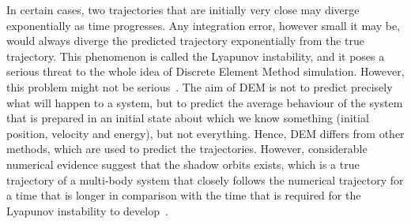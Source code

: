In certain cases, two trajectories that are initially very close may diverge 
exponentially as time progresses. Any integration error, however small it may 
be, would always diverge the predicted trajectory exponentially from the true 
trajectory. This phenomenon is called the Lyapunov instability, and it poses a 
serious threat to the whole idea of Discrete Element Method simulation. 
However, this problem might not be serious~\citep{Frenkel1996}. The aim of DEM 
is not to predict precisely what will happen to a system, but to predict the 
average behaviour of the system that is prepared in an initial state about 
which we 
know something (initial position, velocity and energy), but not everything. 
Hence, DEM differs from other methods, which are used to predict the 
trajectories. However, considerable numerical evidence suggest that 
the shadow orbits exists, which is a true trajectory of a multi-body system 
that closely follows the numerical trajectory for a time that is longer in 
comparison with the time that is required for the Lyapunov instability to 
develop~\citep{Frenkel1996}.

